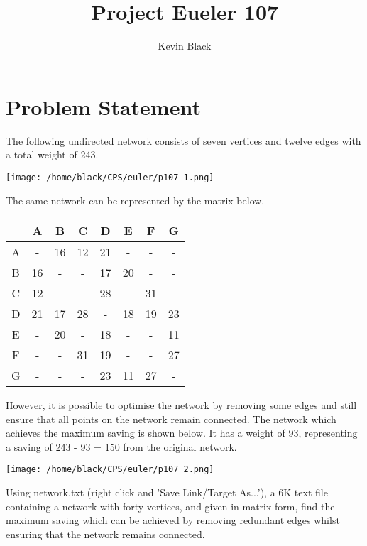 \documentclass[11pt]{article}
\title{\vspace{-1.5cm}Project Eueler 107}
\author{Kevin Black}
\begin{document}
\maketitle

\section{Problem Statement}

The following undirected network consists of seven vertices and twelve edges with a total weight of 243.

\begin{center}
\texttt{[image: /home/black/CPS/euler/p107\_1.png]}
\end{center}

The same network can be represented by the matrix below.

\begin{center}
\begin{tabular}{|c|c|c|c|c|c|c|c|}
\hline
 & A & B & C & D & E & F & G \\ \hline
A & - & 16	&12	&21	&-	&-	&- \\ \hline
B	&16	&-	&-	&17	&20	&-	&- \\ \hline
C	&12	&-	&-	&28	&-	&31	&- \\ \hline
D	&21	&17	&28	&-	&18	&19	&23 \\ \hline 
E	&-	&20	&-	&18	&-	&-	&11 \\ \hline
F	&-	&-	&31	&19	&-	&-	&27 \\ \hline
G	&-	&-	&-	&23	&11	&27	&- \\ \hline
\end{tabular}
\end{center}

However, it is possible to optimise the network by removing some edges and still ensure that all points on the network remain connected. The network which achieves the maximum saving is shown below. It has a weight of 93, representing a saving of 243 - 93 = 150 from the original network.

\begin{center}
\texttt{[image: /home/black/CPS/euler/p107\_2.png]}
\end{center}

Using network.txt (right click and 'Save Link/Target As...'), a 6K text file containing a network with forty vertices, and given in matrix form, find the maximum saving which can be achieved by removing redundant edges whilst ensuring that the network remains connected.
\end{document}
